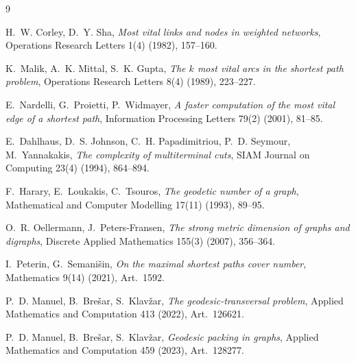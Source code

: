 \documentclass[11pt,a4paper]{amsart}
\theoremstyle{definition}
\theoremstyle{plain}
\begin{document}
\begin{thebibliography}{9}

H.~W. Corley, D.~Y. Sha,
\emph{Most vital links and nodes in weighted networks},
Operations Research Letters 1(4) (1982), 157--160.

K.~Malik, A.~K. Mittal, S.~K. Gupta,
\emph{The $k$ most vital arcs in the shortest path problem},
Operations Research Letters 8(4) (1989), 223--227.

E.~Nardelli, G.~Proietti, P.~Widmayer,
\emph{A faster computation of the most vital edge of a shortest path},
Information Processing Letters 79(2) (2001), 81--85.

E.~Dahlhaus, D.~S. Johnson, C.~H. Papadimitriou, P.~D. Seymour, M.~Yannakakis,
\emph{The complexity of multiterminal cuts},
SIAM Journal on Computing 23(4) (1994), 864--894.

F.~Harary, E.~Loukakis, C.~Tsouros,
\emph{The geodetic number of a graph},
Mathematical and Computer Modelling 17(11) (1993), 89--95.

O.~R. Oellermann, J.~Peters-Fransen,
\emph{The strong metric dimension of graphs and digraphs},
Discrete Applied Mathematics 155(3) (2007), 356--364.

I.~Peterin, G.~Semani\v{s}in,
\emph{On the maximal shortest paths cover number},
Mathematics 9(14) (2021), Art.~1592.

P.~D. Manuel, B.~Bre\v{s}ar, S.~Klav\v{z}ar,
\emph{The geodesic-transversal problem},
Applied Mathematics and Computation 413 (2022), Art.~126621.

P.~D. Manuel, B.~Bre\v{s}ar, S.~Klav\v{z}ar,
\emph{Geodesic packing in graphs},
Applied Mathematics and Computation 459 (2023), Art.~128277.

\end{thebibliography}
\end{document}
